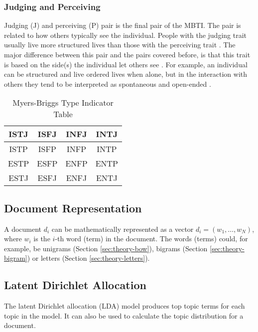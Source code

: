 \subsubsection{Judging and Perceiving}
Judging (J) and perceiving (P) pair is the final pair of the MBTI.
The pair is related to how others typically see the individual.
People with the judging trait usually live more structured lives than those with the perceiving trait \cite{mbti-JP}.
The major difference between this pair and the pairs covered before, is that this trait is based on the side(s) the individual let others see \cite{mbti-JP}.
For example, an individual can be structured and live ordered lives when alone, but in the interaction with others they tend to be interpreted as spontaneous and open-ended \cite{mbti-JP}.

\begin{table}[!t]
    \renewcommand{\arraystretch}{3}
    \caption{Myers-Briggs Type Indicator Table}
    \label{tab:mbti-types}
    \centering
    \begin{tabular}{|c|c|c|c|}
        \hline
        ISTJ & ISFJ & INFJ & INTJ \\
        \hline
        ISTP & ISFP & INFP & INTP \\
        \hline
        ESTP & ESFP & ENFP & ENTP \\
        \hline
        ESTJ & ESFJ & ENFJ & ENTJ \\
        \hline
    \end{tabular}
\end{table}

\subsection{Document Representation}
A document $d_i$ can be mathematically represented as a vector $d_i = (w_1, \ldots, w_N)$, where $w_i$ is the $i$-th word (term) in the document.
The words (terms) could, for example, be unigrams (Section \ref{sec:theory-bow}), bigrams (Section \ref{sec:theory-bigram}) or letters (Section \ref{sec:theory-letters}).

\subsection{Latent Dirichlet Allocation}
The latent Dirichlet allocation (LDA) model produces top topic terms for each topic in the model.
It can also be used to calculate the topic distribution for a document.

